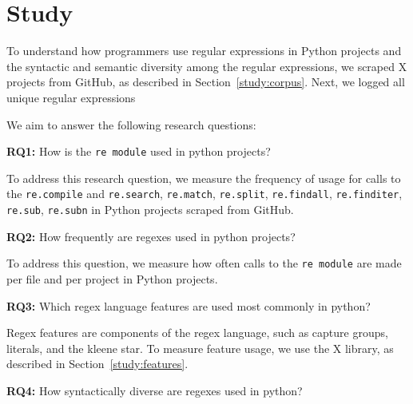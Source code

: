 \section{Study}


To understand how programmers use regular expressions in Python projects and the syntactic and semantic diversity among the regular expressions, we scraped X projects from GitHub, as described in Section~\ref{study:corpus}. Next, we logged all unique regular expressions 

We aim to answer the following research questions:

\textbf{RQ1:} How is the {\tt re module} used in python projects?

To address this research question, we measure the frequency of usage for calls to the {\tt re.compile} and {\tt re.search}, {\tt re.match}, {\tt re.split}, {\tt re.findall}, {\tt re.finditer}, {\tt re.sub}, {\tt re.subn} in Python projects scraped from GitHub. 

\textbf{RQ2:} How frequently are regexes used in python projects?

To address this question, we measure how often  calls to the {\tt re module} are made per file and per project in Python projects. 

\textbf{RQ3:} Which regex language features are used most commonly in python?

Regex features are components of the regex language, such as capture groups, literals, and the kleene star. To measure feature usage, we use the X library, as described in Section~\ref{study:features}. 

\textbf{RQ4:} How syntactically diverse are regexes used in python?


